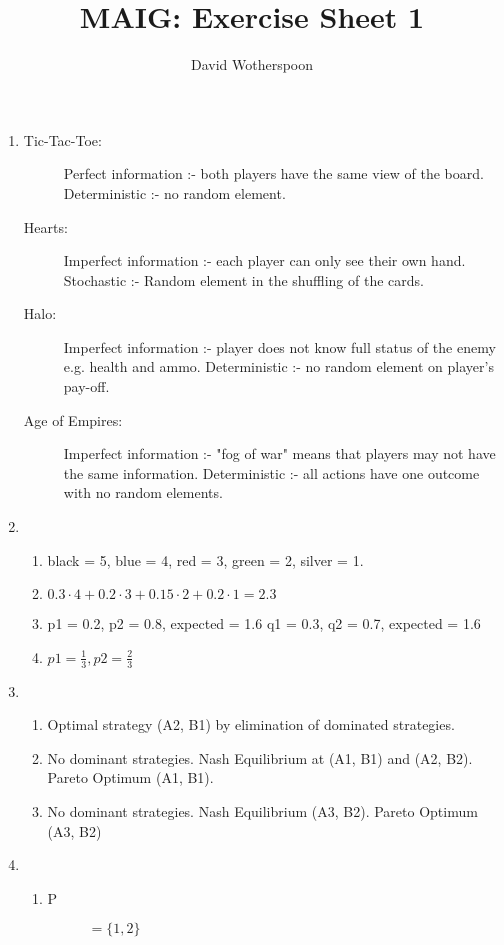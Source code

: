 \documentclass[a4paper]{article}
\title{MAIG: Exercise Sheet 1}
\author{David Wotherspoon}
\date{}
\begin{document}
\maketitle
\begin{enumerate}
	\item
		\begin{description}
			\item[Tic-Tac-Toe:] Perfect information :- both players have the same view of the board. Deterministic :- no random element.
			\item[Hearts:] Imperfect information :- each player can only see their own hand. Stochastic :- Random element in the shuffling of the cards.
			\item[Halo:] Imperfect information :- player does not know full status of the enemy e.g. health and ammo. Deterministic :- no random element on player's pay-off.
			\item[Age of Empires:] Imperfect information :- "fog of war" means that players may not have the same information. Deterministic :- all actions have one outcome with no random elements.
		\end{description}
	\item
		\begin{enumerate}
			\item black = 5, blue = 4, red = 3, green = 2, silver = 1.
			\item \( 0.3\cdot4 + 0.2\cdot3 + 0.15\cdot2 + 0.2\cdot1 = 2.3\)
			\item p1 = 0.2, p2 = 0.8, expected = 1.6 \newline
			q1 = 0.3, q2 = 0.7, expected = 1.6
			\item \(p1 = \frac{1}{3}, p2 = \frac{2}{3}\)
		\end{enumerate}
	\item
		\begin{enumerate}
			\item Optimal strategy (A2, B1) by elimination of dominated strategies.
			\item No dominant strategies. Nash Equilibrium at (A1, B1) and (A2, B2). Pareto Optimum (A1, B1).
			\item No dominant strategies. Nash Equilibrium (A3, B2). Pareto Optimum (A3, B2)
		\end{enumerate}
	\item
		\begin{enumerate}
			\item
			\begin{description}
				\item[P] \( = \lbrace 1, 2\rbrace \)

\end{description}
\end{enumerate}
\end{enumerate}
\end{document}
